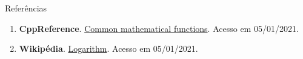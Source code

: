 \begin{frame}[fragile]{Referências}

    \begin{enumerate}
        \item \textbf{CppReference}. \href{https://en.cppreference.com/w/cpp/numeric/math}{Common mathematical functions}. Acesso em 05/01/2021.

       \item \textbf{Wikipédia}. \href{https://en.wikipedia.org/wiki/Logarithm}{Logarithm}. Acesso em 05/01/2021.
    \end{enumerate}

\end{frame}
